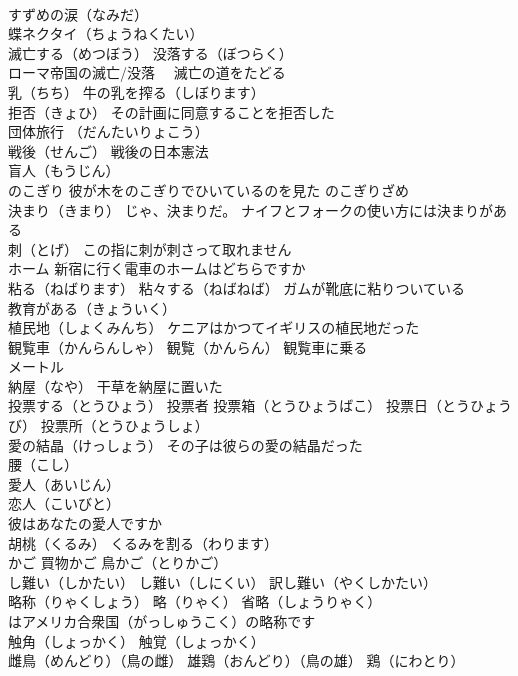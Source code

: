 \documentclass[8pt]{extreport}
\begin{document}
\begin{CJK}{UTF8}{min}
\\	すずめの涙（なみだ）
\\	蝶ネクタイ（ちょうねくたい）
\\	滅亡する（めつぼう） 没落する（ぼつらく）
\\	ローマ帝国の滅亡/没落　 滅亡の道をたどる
\\	乳（ちち） 牛の乳を搾る（しぼります）
\\	拒否（きょひ） その計画に同意することを拒否した
\\	団体旅行 （だんたいりょこう）
\\	戦後（せんご） 戦後の日本憲法
\\	盲人（もうじん）
\\	のこぎり 彼が木をのこぎりでひいているのを見た のこぎりざめ
\\	決まり（きまり） じゃ、決まりだ。 ナイフとフォークの使い方には決まりがある
\\	刺（とげ） この指に刺が刺さって取れません
\\	ホーム 新宿に行く電車のホームはどちらですか
\\	粘る（ねばります） 粘々する（ねばねば） ガムが靴底に粘りついている
\\	教育がある（きょういく）
\\	植民地（しょくみんち） ケニアはかつてイギリスの植民地だった
\\	観覧車（かんらんしゃ） 観覧（かんらん） 観覧車に乗る
\\	メートル
\\	納屋（なや） 干草を納屋に置いた
\\	投票する（とうひょう） 投票者 投票箱（とうひょうばこ） 投票日（とうひょうび） 投票所（とうひょうしょ）
\\	愛の結晶（けっしょう） その子は彼らの愛の結晶だった
\\	腰（こし）
\\	愛人（あいじん）
\\	恋人（こいびと）
\\	彼はあなたの愛人ですか
\\	胡桃（くるみ） くるみを割る（わります）
\\	かご 買物かご 鳥かご（とりかご）
\\	し難い（しかたい） し難い（しにくい） 訳し難い（やくしかたい）
\\	略称（りゃくしょう） 略（りゃく） 省略（しょうりゃく） 
\\	はアメリカ合衆国（がっしゅうこく）の略称です
\\	触角（しょっかく） 触覚（しょっかく）
\\	雌鳥（めんどり）（鳥の雌） 雄鶏（おんどり）（鳥の雄） 鶏（にわとり）

\end{CJK}
\end{document}
